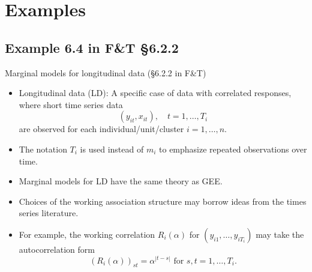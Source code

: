 \documentclass{beamer}
\newcommand{\currentsection}{}
\let\oldsection\section
\renewcommand{\section}[1]{\oldsection{#1}\renewcommand{\currentsection}{#1}}
\newcommand{\currentsubsection}{}
\let\oldsubsection\subsection
\renewcommand{\subsection}[1]{\oldsubsection{#1}\renewcommand{\currentsubsection}{#1}}
\newenvironment{wideitemize}%
  {\begin{itemize}%
    \setlength{\parskip}{1em}}%
  {\end{itemize}}
\begin{document}
%
%
%
%



\section{Examples}\label{sec:6.2}
\subsection{Example 6.4 in F\&T \S6.2.2}\label{sec:6.2.2}

\begin{frame}{Marginal models for longitudinal data (\S 6.2.2 in F\&T)}

\begin{wideitemize}
\item Longitudinal data (LD): A specific case of data with correlated responses, where short time series data
\[
(y_{it}, x_{it}), \quad t = 1, \dots, T_i
\]
are observed for each individual/unit/cluster $i =1, \dots, n$. 

\item The notation $T_i$ is used  instead of $m_i$ to emphasize repeated observations over time.

\item Marginal models for LD have the same theory as GEE. 

\item Choices of the working association structure may borrow ideas from the times series literature. 

\item For example, the working correlation $R_i (\alpha)$ for $(y_{i1}, \dots, y_{iT_i})$ may take the autocorrelation form 
\[
(R_i (\alpha))_{st} = \alpha^{|t-s|} \text{ for  } s, t = 1, \dots, T_i.
\]

\end{wideitemize}


\end{frame}
\end{document}
